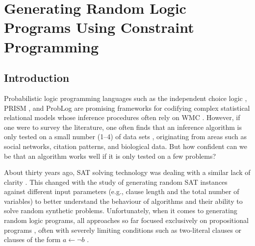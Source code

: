 \chapter{Generating Random Logic Programs Using Constraint
  Programming}\label{chapter:randomlps}

\section{Introduction}

Probabilistic logic programming languages such as the independent choice logic
\citep{DBLP:journals/ai/Poole97}, PRISM \citep{DBLP:conf/ijcai/SatoK97}, and
ProbLog \citep{DBLP:conf/ijcai/RaedtKT07} are promising frameworks for codifying
complex statistical relational models whose inference procedures often rely on
WMC
\citep{DBLP:conf/uai/FierensBTGR11,DBLP:journals/tplp/FierensBRSGTJR15,DBLP:conf/aaai/VlasselaerKDMR16}.
However, if one were to survey the literature, one often finds that an inference
algorithm is only tested on a small number (1--4) of data sets
\citep{DBLP:conf/ecai/BruynoogheMKGVJR10,DBLP:journals/tplp/KimmigDRCR11,DBLP:conf/ijcai/VlasselaerBKMR15},
originating from areas such as social networks, citation patterns, and
biological data. But how confident can we be that an algorithm works well if it
is only tested on a few problems?

About thirty years ago, SAT solving technology was dealing with a similar lack
of clarity \citep{DBLP:journals/ai/SelmanML96}. This changed with the study of
generating random SAT instances against different input parameters (e.g.,
clause length and the total number of variables) to better understand the
behaviour of algorithms and their ability to solve random synthetic problems.
Unfortunately, when it comes to generating random logic programs, all approaches
so far focused exclusively on propositional programs
\citep{DBLP:conf/ijcai/AmendolaRT17,DBLP:journals/ai/AmendolaRT20,DBLP:journals/tplp/WangWM15,DBLP:conf/iclp/ZhaoL03},
often with severely limiting conditions such as two-literal clauses
\citep{DBLP:conf/iclp/Namasivayam09,DBLP:conf/lpnmr/NamasivayamT09} or clauses of
the form $a \gets \neg b$ \citep{DBLP:journals/tocl/WenWSL16}.

